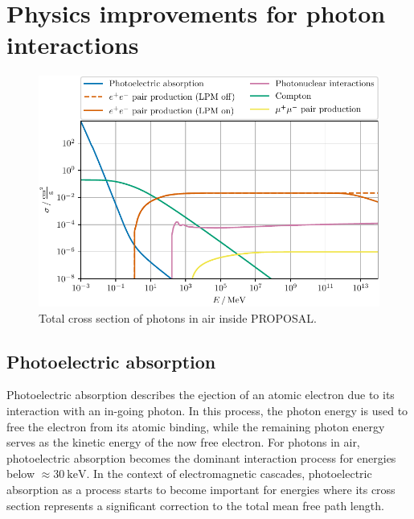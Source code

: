 \section{Physics improvements for photon interactions}

\begin{figure}
	\centering
    \includegraphics{plots/Photon_Air_dndx_ecut_0.pdf}
    \caption{Total cross section of photons in air inside PROPOSAL.}
    \label{fig:total_cross_photon}
\end{figure}


\subsection{Photoelectric absorption}

Photoelectric absorption describes the ejection of an atomic electron due to its interaction with an in-going photon.
In this process, the photon energy is used to free the electron from its atomic binding, while the remaining photon energy serves as the kinetic energy of the now free electron.
For photons in air, photoelectric absorption becomes the dominant interaction process for energies below $\approx \SI{30}{\kilo\electronvolt}$.
In the context of electromagnetic cascades, photoelectric absorption as a process starts to become important for energies where its cross section represents a significant correction to the total mean free path length.

